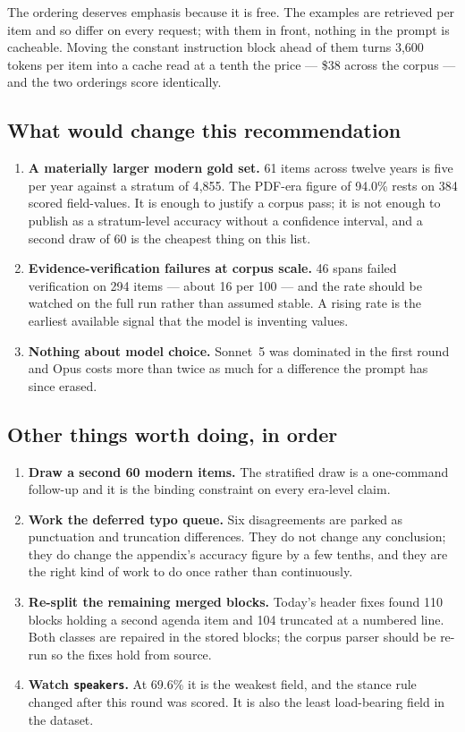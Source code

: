 \documentclass[11pt]{article}
\begin{document}
The ordering deserves emphasis because it is free. The examples are retrieved per item and so
differ on every request; with them in front, nothing in the prompt is cacheable. Moving the
constant instruction block ahead of them turns 3{,}600 tokens per item into a cache read at a
tenth the price --- \$38 across the corpus --- and the two orderings score identically.

\subsection{What would change this recommendation}

\begin{enumerate}
\item \textbf{A materially larger modern gold set.} 61 items across twelve years is five per
year against a stratum of 4{,}855. The PDF-era figure of 94.0\% rests on 384 scored
field-values. It is enough to justify a corpus pass; it is not enough to publish as a
stratum-level accuracy without a confidence interval, and a second draw of 60 is the cheapest
thing on this list.
\item \textbf{Evidence-verification failures at corpus scale.} 46 spans failed verification
on 294 items --- about 16 per 100 --- and the rate should be watched on the full run rather
than assumed stable. A rising rate is the earliest available signal that the model is
inventing values.
\item \textbf{Nothing about model choice.} Sonnet~5 was dominated in the first round and Opus
costs more than twice as much for a difference the prompt has since erased.
\end{enumerate}

\subsection{Other things worth doing, in order}

\begin{enumerate}
\item \textbf{Draw a second 60 modern items.} The stratified draw is a one-command follow-up
and it is the binding constraint on every era-level claim.
\item \textbf{Work the deferred typo queue.} Six disagreements are parked as punctuation and
truncation differences. They do not change any conclusion; they do change the appendix's
accuracy figure by a few tenths, and they are the right kind of work to do once rather than
continuously.
\item \textbf{Re-split the remaining merged blocks.} Today's header fixes found 110 blocks
holding a second agenda item and 104 truncated at a numbered line. Both classes are repaired
in the stored blocks; the corpus parser should be re-run so the fixes hold from source.
\item \textbf{Watch \texttt{speakers}.} At 69.6\% it is the weakest field, and the stance rule
changed after this round was scored. It is also the least load-bearing field in the dataset.
\end{enumerate}
\end{document}
